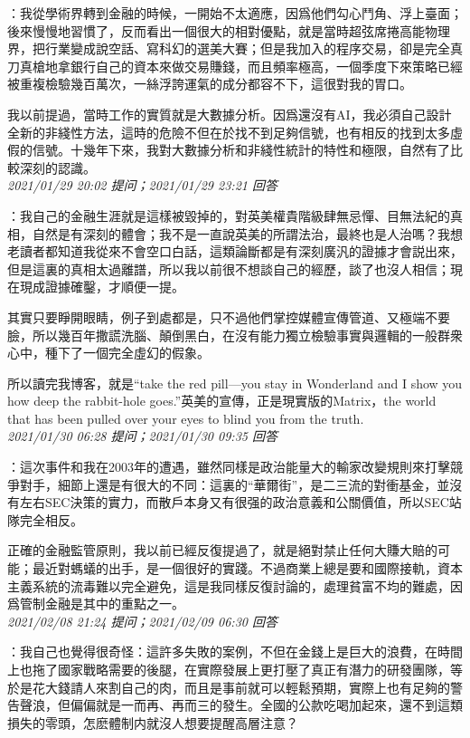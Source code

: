 \documentclass[twocolumn]{ctexart}
\begin{document}
：我從學術界轉到金融的時候，一開始不太適應，因爲他們勾心鬥角、浮上臺面；後來慢慢地習慣了，反而看出一個很大的相對優點，就是當時超弦席捲高能物理界，把行業變成說空話、寫科幻的選美大賽；但是我加入的程序交易，卻是完全真刀真槍地拿銀行自己的資本來做交易賺錢，而且頻率極高，一個季度下來策略已經被重複檢驗幾百萬次，一絲浮誇運氣的成分都容不下，這很對我的胃口。

我以前提過，當時工作的實質就是大數據分析。因爲還沒有AI，我必須自己設計全新的非綫性方法，這時的危險不但在於找不到足夠信號，也有相反的找到太多虛假的信號。十幾年下來，我對大數據分析和非綫性統計的特性和極限，自然有了比較深刻的認識。
\\

\textit{\hfill\noindent\small 2021/01/29 20:02 提问；2021/01/29 23:21 回答}

：我自己的金融生涯就是這樣被毀掉的，對英美權貴階級肆無忌憚、目無法紀的真相，自然是有深刻的體會；我不是一直說英美的所謂法治，最終也是人治嗎？我想老讀者都知道我從來不會空口白話，這類論斷都是有深刻廣汎的證據才會説出來，但是這裏的真相太過離譜，所以我以前很不想談自己的經歷，談了也沒人相信；現在現成證據確鑿，才順便一提。

其實只要睜開眼睛，例子到處都是，只不過他們掌控媒體宣傳管道、又極端不要臉，所以幾百年撒謊洗腦、顛倒黑白，在沒有能力獨立檢驗事實與邏輯的一般群衆心中，種下了一個完全虛幻的假象。

所以讀完我博客，就是“take the red pill—you stay in Wonderland and I show you how deep the rabbit-hole goes.”英美的宣傳，正是現實版的Matrix，the world that has been pulled over your eyes to blind you from the truth.
\\

\textit{\hfill\noindent\small 2021/01/30 06:28 提问；2021/01/30 09:35 回答}

：這次事件和我在2003年的遭遇，雖然同樣是政治能量大的輸家改變規則來打擊競爭對手，細節上還是有很大的不同：這裏的“華爾街”，是二三流的對衝基金，並沒有左右SEC決策的實力，而散戶本身又有很强的政治意義和公關價值，所以SEC站隊完全相反。

正確的金融監管原則，我以前已經反復提過了，就是絕對禁止任何大賺大賠的可能；最近對螞蟻的出手，是一個很好的實踐。不過商業上總是要和國際接軌，資本主義系統的流毒難以完全避免，這是我同樣反復討論的，處理貧富不均的難處，因爲管制金融是其中的重點之一。
\\

\textit{\hfill\noindent\small 2021/02/08 21:24 提问；2021/02/09 06:30 回答}

：我自己也覺得很奇怪：這許多失敗的案例，不但在金錢上是巨大的浪費，在時間上也拖了國家戰略需要的後腿，在實際發展上更打壓了真正有潛力的研發團隊，等於是花大錢請人來割自己的肉，而且是事前就可以輕鬆預期，實際上也有足夠的警告聲浪，但偏偏就是一而再、再而三的發生。全國的公款吃喝加起來，還不到這類損失的零頭，怎麽體制内就沒人想要提醒高層注意？
\end{document}
